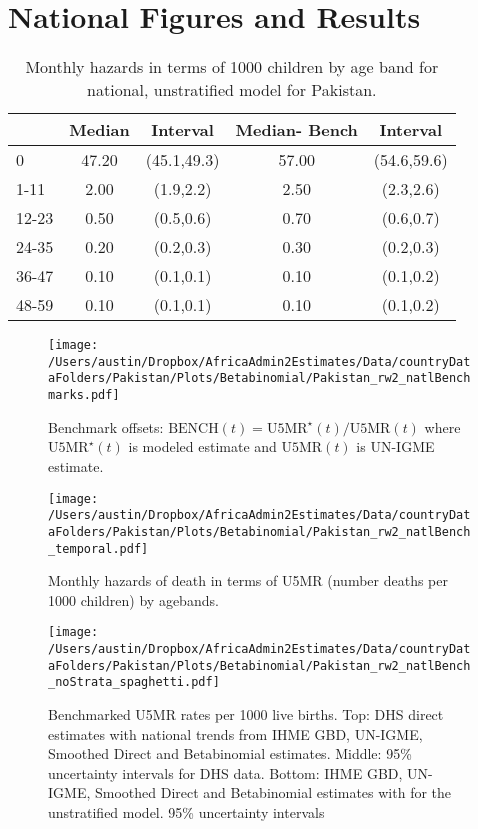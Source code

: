 \documentclass[]{article}
\begin{document}


\hypertarget{national-figures-and-results}{%
\section{National Figures and
Results}\label{national-figures-and-results}}

\begin{table}[ht]
\centering
\begin{tabular}{l|cc|cc}
  \hline
 & Median & Interval & Median- Bench & Interval \\ 
  \hline
0 & 47.20 & (45.1,49.3) & 57.00 & (54.6,59.6) \\ 
  1-11 & 2.00 & (1.9,2.2) & 2.50 & (2.3,2.6) \\ 
  12-23 & 0.50 & (0.5,0.6) & 0.70 & (0.6,0.7) \\ 
  24-35 & 0.20 & (0.2,0.3) & 0.30 & (0.2,0.3) \\ 
  36-47 & 0.10 & (0.1,0.1) & 0.10 & (0.1,0.2) \\ 
  48-59 & 0.10 & (0.1,0.1) & 0.10 & (0.1,0.2) \\ 
   \hline
\end{tabular}
\caption{Monthly hazards in terms of 1000 children by age band for national, unstratified model for Pakistan.} 
\end{table}

\begin{figure}
    \centering
    \texttt{[image: /Users/austin/Dropbox/AfricaAdmin2Estimates/Data/countryDataFolders/Pakistan/Plots/Betabinomial/Pakistan\_rw2\_natlBenchmarks.pdf]}
    \caption{Benchmark offsets: $
\mbox{BENCH}(t) = \mbox{U5MR}^\star(t)/\mbox{U5MR}(t)$ 
 where $\mbox{U5MR}^\star(t)$ is modeled estimate and  $\mbox{U5MR}(t)
$ is UN-IGME estimate.}
\end{figure}

\begin{figure}
    \centering
    \texttt{[image: /Users/austin/Dropbox/AfricaAdmin2Estimates/Data/countryDataFolders/Pakistan/Plots/Betabinomial/Pakistan\_rw2\_natlBench\_temporal.pdf]}
    \caption{Monthly hazards of death in terms of U5MR (number deaths per 1000 children) by agebands.}
\end{figure}
\clearpage

\begin{figure}
    \centering
    \texttt{[image: /Users/austin/Dropbox/AfricaAdmin2Estimates/Data/countryDataFolders/Pakistan/Plots/Betabinomial/Pakistan\_rw2\_natlBench\_noStrata\_spaghetti.pdf]}
    \caption{Benchmarked U5MR rates per 1000 live births. Top: DHS direct estimates with national trends from IHME GBD, UN-IGME, Smoothed Direct and Betabinomial estimates. Middle: 95\% uncertainty intervals for DHS data. Bottom: IHME GBD, UN-IGME, Smoothed Direct and Betabinomial estimates with for the unstratified model. 95\% uncertainty intervals}
\end{figure}
\clearpage
\end{document}
